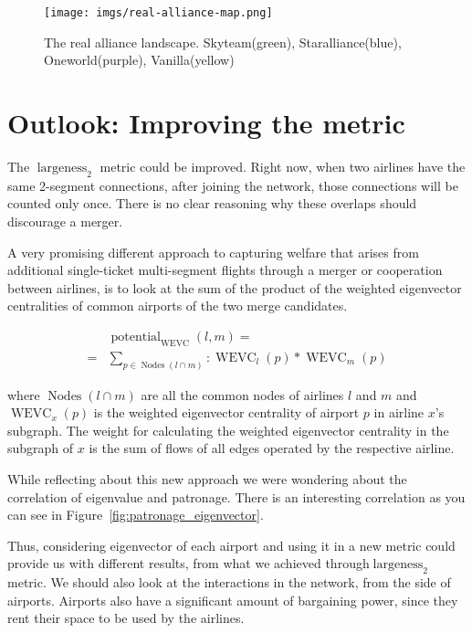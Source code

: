\documentclass[twocolumn]{tum-article}
\DeclareMathOperator{\Largeness}{largeness}
\DeclareMathOperator{\Potential}{potential}
\DeclareMathOperator{\WEVC}{WEVC}
\DeclareMathOperator{\Nodes}{Nodes}
\begin{document}
\begin{figure}
	\centering
	\texttt{[image: imgs/real-alliance-map.png]}
	\caption{
The real alliance landscape. Skyteam(green), Staralliance(blue), Oneworld(purple), Vanilla(yellow)}
	\label{fig:real-alliance-map}
\end{figure}

\section{Outlook: Improving the metric}
The $\Largeness_{2}$ metric could be improved. Right now, when two airlines have the same 2-segment connections, after joining the network, those connections will be counted only once. There is no clear reasoning why these overlaps should discourage a merger. 

A very promising different approach to capturing welfare that arises from additional single-ticket multi-segment flights through a merger or cooperation between airlines, is to look at the sum of the product of the weighted eigenvector centralities of common airports of the two merge candidates. 

\begin{equation}
\begin{aligned}
& \Potential_{\WEVC}(l, m) = \\
 = & \sum_{p \in \Nodes(l \cap m)}: \WEVC_{l}(p) * \WEVC_{m}(p)
\end{aligned}
\end{equation}

where $\Nodes(l \cap m)$ are all the common nodes of airlines $l$ and $m$ and $\WEVC_{x}(p)$ is the weighted eigenvector centrality of airport $p$ in airline $x$'s subgraph. 
The weight for calculating the weighted eigenvector centrality in the subgraph of $x$ is the sum of flows of all edges operated by the respective airline. 

While reflecting about this new approach we were wondering about the correlation of eigenvalue and patronage. There is an interesting correlation as you can see in Figure~\ref{fig:patronage_eigenvector}.

Thus, considering eigenvector of each airport and using it in a new metric could provide us with different results, from what we achieved through$\Largeness_{2}$ metric. 
We should also look at the interactions in the network, from the side of airports. Airports also have a significant amount of bargaining power, since they rent their space to be used by the airlines. 
\end{document}
